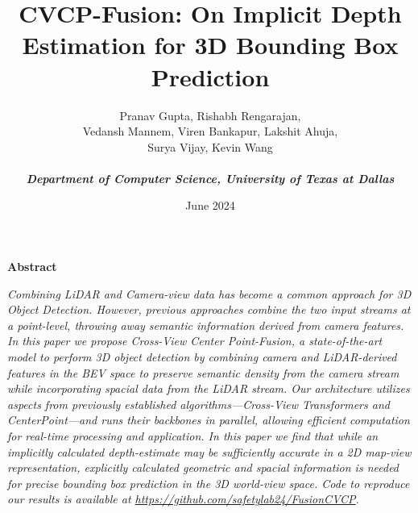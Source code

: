 \documentclass[a4paper,12pt]{article}
\title{\Huge{\textbf{CVCP-Fusion: On Implicit Depth Estimation for 3D Bounding Box Prediction}}}
\author{Pranav Gupta, Rishabh Rengarajan,\\ Vedansh Mannem, Viren Bankapur, Lakshit Ahuja,\\ Surya Vijay, Kevin Wang\\\\\normalsize{\textit{\textbf{Department of Computer Science, University of Texas at Dallas}}}}
\date{June 2024}
\begin{document}
\maketitle

\begin{center} \Large{{\textbf{Abstract}}} \end{center}

\textit{Combining LiDAR and Camera-view data has become a common approach for 3D Object Detection. However, previous approaches combine the two input streams at a point-level, throwing away semantic information derived from camera features. In this paper we propose Cross-View Center Point-Fusion, a state-of-the-art model to perform 3D object detection by combining camera and LiDAR-derived features in the BEV space to preserve semantic density from the camera stream while incorporating spacial data from the LiDAR stream. Our  architecture utilizes aspects from previously established algorithms—Cross-View Transformers and CenterPoint—and runs their backbones in parallel, allowing efficient computation for real-time processing and application. In this paper we find that while an implicitly calculated depth-estimate may be sufficiently accurate  in a 2D map-view representation, explicitly calculated geometric and spacial information is needed for precise bounding box prediction in the 3D world-view space. Code to reproduce our results is available at  \url{https://github.com/safetylab24/FusionCVCP}.}
\end{document}
